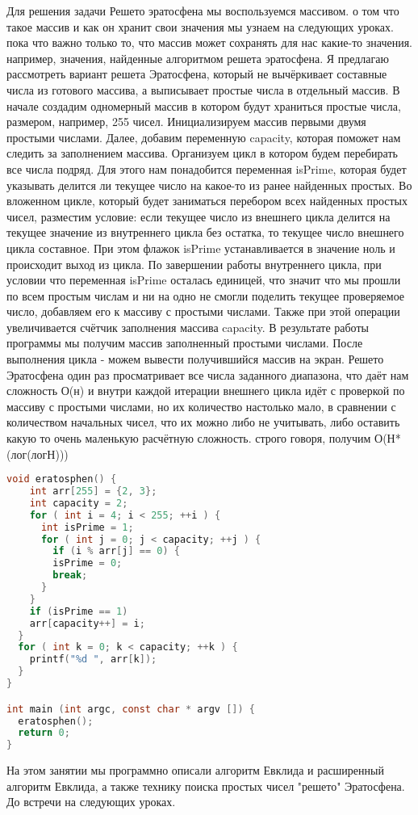 \documentclass[fontsize=14bp]{report}
\begin{document}
Для решения задачи Решето эратосфена мы воспользуемся массивом. о том что такое массив и как он хранит свои значения мы узнаем на следующих уроках. пока что важно только то, что массив может сохранять для нас какие-то значения. например, значения, найденные алгоритмом решета эратосфена.
Я предлагаю рассмотреть вариант решета Эратосфена, который не вычёркивает составные числа из готового массива, а выписывает простые числа в отдельный массив. В начале создадим одномерный массив в котором будут храниться простые числа, размером, например, 255 чисел. Инициализируем массив первыми двумя простыми числами. Далее, добавим переменную capacity, которая поможет нам следить за заполнением массива. Организуем цикл в котором будем перебирать все числа подряд. Для этого нам понадобится переменная isPrime, которая будет указывать делится ли текущее число на какое-то из ранее найденных простых. Во вложенном цикле, который будет заниматься перебором всех найденных простых чисел, разместим условие: если текущее число из внешнего цикла делится на текущее значение из внутреннего цикла без остатка, то текущее число внешнего цикла составное. При этом флажок isPrime устанавливается в значение ноль и происходит выход из цикла. По завершении работы внутреннего цикла, при условии что переменная isPrime осталась единицей, что значит что мы прошли по всем простым числам и ни на одно не смогли поделить текущее проверяемое число, добавляем его к массиву с простыми числами. Также при этой операции увеличивается счётчик заполнения массива capacity. В результате работы программы мы получим массив заполненный простыми числами. После выполнения цикла - можем вывести получившийся массив на экран. Решето Эратосфена один раз просматривает все числа заданного диапазона, что даёт нам сложность О(н) и внутри каждой итерации внешнего цикла идёт с проверкой по массиву с простыми числами, но их количество настолько мало, в сравнении с количеством начальных чисел, что их можно либо не учитывать, либо оставить какую то очень маленькую расчётную сложность. строго говоря, получим О(Н*(лог(логН)))
\begin{lstlisting}[language=C,style=CCodeStyle]
  void eratosphen() {
    int arr[255] = {2, 3};
    int capacity = 2;
    for ( int i = 4; i < 255; ++i ) {
      int isPrime = 1;
      for ( int j = 0; j < capacity; ++j ) {
        if (i % arr[j] == 0) {
        isPrime = 0;
        break;
      }
    }
    if (isPrime == 1)
    arr[capacity++] = i;
  }
  for ( int k = 0; k < capacity; ++k ) {
    printf("%d ", arr[k]);
  }
}

int main (int argc, const char * argv []) {
  eratosphen();
  return 0;
}
\end{lstlisting}

На этом занятии мы программно описали алгоритм Евклида и расширенный алгоритм Евклида, а также технику поиска простых чисел "решето" Эратосфена. До встречи на следующих уроках.
\end{document}
